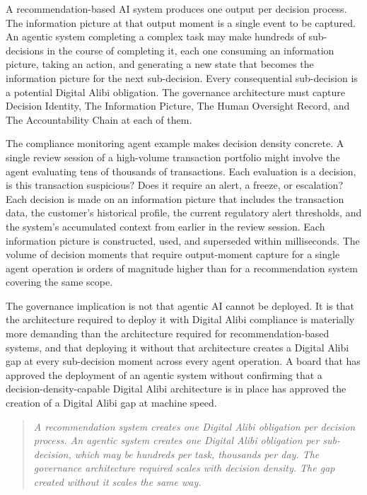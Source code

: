 A recommendation-based AI system produces one output per decision process. The information picture at that output moment is a single event to be captured. An agentic system completing a complex task may make hundreds of sub-decisions in the course of completing it, each one consuming an information picture, taking an action, and generating a new state that becomes the information picture for the next sub-decision. Every consequential sub-decision is a potential Digital Alibi obligation. The governance architecture must capture Decision Identity, The Information Picture, The Human Oversight Record, and The Accountability Chain at each of them.

The compliance monitoring agent example makes decision density concrete. A single review session of a high-volume transaction portfolio might involve the agent evaluating tens of thousands of transactions. Each evaluation is a decision, is this transaction suspicious? Does it require an alert, a freeze, or escalation? Each decision is made on an information picture that includes the transaction data, the customer's historical profile, the current regulatory alert thresholds, and the system's accumulated context from earlier in the review session. Each information picture is constructed, used, and superseded within milliseconds. The volume of decision moments that require output-moment capture for a single agent operation is orders of magnitude higher than for a recommendation system covering the same scope.

The governance implication is not that agentic AI cannot be deployed. It is that the architecture required to deploy it with Digital Alibi compliance is materially more demanding than the architecture required for recommendation-based systems, and that deploying it without that architecture creates a Digital Alibi gap at every sub-decision moment across every agent operation. A board that has approved the deployment of an agentic system without confirming that a decision-density-capable Digital Alibi architecture is in place has approved the creation of a Digital Alibi gap at machine speed.

\begin{quote}
\emph{A recommendation system creates one Digital Alibi obligation per decision process. An agentic system creates one Digital Alibi obligation per sub-decision, which may be hundreds per task, thousands per day. The governance architecture required scales with decision density. The gap created without it scales the same way.}
\end{quote}

